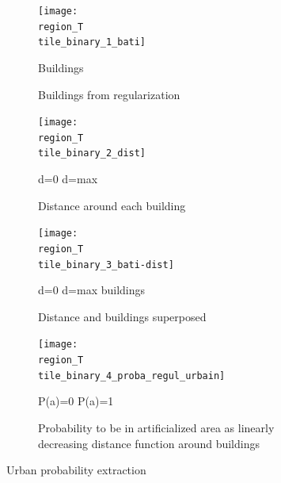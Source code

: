 \documentclass[10pt]{article}
\newcommand{\tile}{41000_30000}
\newcommand{\region}{finistere}
\begin{document}
\begin{figure}[H]
    \centering
    \begin{subfigure}{0.49\textwidth}
        \centering
        \texttt{[image: \\region\_T\\tile\_binary\_1\_bati]}
        \caption{Buildings from regularization}
        {\vspace{3mm}
            \small\centering
            \quad Buildings
        }
    \end{subfigure}
    \begin{subfigure}{0.49\textwidth}
        \centering
        \texttt{[image: \\region\_T\\tile\_binary\_2\_dist]}
        \caption{Distance around each building}
        {\vspace{3mm}
            \small\centering
            \quad d=0 
            \quad d=max
        }
    \end{subfigure}
    \begin{subfigure}{0.49\textwidth}
        \centering
        \texttt{[image: \\region\_T\\tile\_binary\_3\_bati-dist]}
        \caption{Distance and buildings superposed}
        {\vspace{3mm}
            \small\centering
            \quad d=0 
            \quad d=max
             \quad buildings
        }
    \end{subfigure}
    \begin{subfigure}{0.49\textwidth}
        \centering
        \texttt{[image: \\region\_T\\tile\_binary\_4\_proba\_regul\_urbain]}
        \caption{Probability to be in artificialized area as linearly decreasing distance function around buildings}
        {\vspace{3mm}
            \small\centering
            \quad P(a)=0 
            \quad P(a)=1
        }
    \end{subfigure}
    \caption{Urban probability extraction}
    \label{fig:regul_fusion_steps}
\end{figure}
\end{document}
